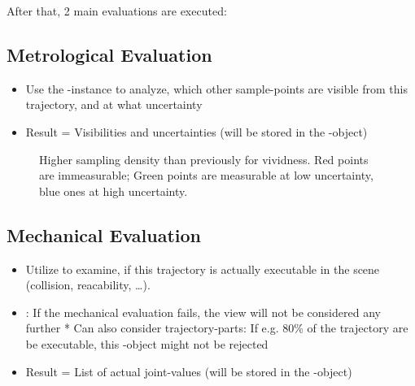 \documentclass[letterpaper,10pt,english]{sphinxmanual}
\begin{document}
\begin{figure}[htbp]
\centering

\noindent{}
\end{figure}

After that, 2 main evaluations are executed:


\subsection{Metrological Evaluation}
\label{\detokenize{view_planning_detailed:metrological-evaluation}}\begin{itemize}
\item {} 
Use the {\hyperref[\detokenize{module_sensor_model:sensor-model}]{}}-instance to analyze, which other sample-points are visible from this trajectory, and at what uncertainty

\item {} 
Result = Visibilities and uncertainties (will be stored in the {\hyperref[\detokenize{module_view:view}]{}}-object)

\end{itemize}

\begin{figure}[htbp]
\centering
\capstart

\noindent{}
\caption{Higher sampling density than previously for vividness. Red points are immeasurable; Green points are measurable at low uncertainty, blue ones at high uncertainty.}\label{\detokenize{view_planning_detailed:id6}}\end{figure}


\subsection{Mechanical Evaluation}
\label{\detokenize{view_planning_detailed:mechanical-evaluation}}\begin{itemize}
\item {} 
Utilize  to examine, if this trajectory is actually executable in the scene (collision, reacability, …).

\item {} 
: If the mechanical evaluation fails, the view will not be considered any further
* Can also consider trajectory-parts: If e.g. 80\% of the trajectory are be executable, this {\hyperref[\detokenize{module_view:view}]{}}-object might not be rejected

\item {} 
Result = List of actual joint-values (will be stored in the {\hyperref[\detokenize{module_view:view}]{}}-object)

\end{itemize}
\end{document}
